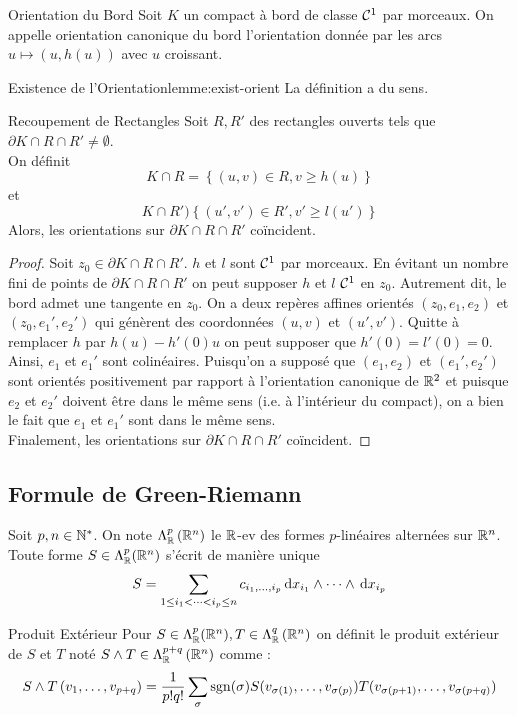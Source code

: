 \documentclass{cours}
\begin{document}
\begin{définition}{Orientation du Bord}{}
	Soit $K$ un compact à bord de classe $\mathcal{C}^{1}$ par morceaux. On appelle orientation canonique du bord l'orientation donnée par les arcs $u \mapsto (u, h(u))$ avec $u$ croissant.
\end{définition}

\begin{lemme}{Existence de l'Orientation}{lemme:exist-orient}
	La définition a du sens.
\end{lemme}
\begin{lemme}{Recoupement de Rectangles}{}
	Soit $R, R'$ des rectangles ouverts tels que $\partial K \cap R \cap R' \neq \emptyset$.\\
	On définit 
	\[
		K \cap R = \left\{(u, v) \in R, v\geq h(u)\right\}
	\]
	et 
	\[
		K \cap R' ) \left\{(u', v')\in R', v' \geq l(u')\right\}
	\]
	Alors, les orientations sur $\partial K \cap R \cap R'$ coïncident.
\end{lemme}
\begin{proof}
	Soit $z_{0}  \in \partial K \cap R \cap R'$. $h$ et $l$ sont $\mathcal{C}^{1}$ par morceaux. 
	En évitant un nombre fini de points de $\partial K \cap R\cap R'$ on peut supposer $h$ et $l$ $\mathcal{C}^{1}$ en $z_{0}$. 
	Autrement dit, le bord admet une tangente en $z_{0}$. On a deux repères affines orientés $(z_{0}, e_{1}, e_{2})$ et $(z_{0}, e_{1}', e_{2}')$ qui génèrent des coordonnées $(u, v)$ et $(u', v')$.
	Quitte à remplacer $h$ par $h(u) - h'(0)u$ on peut supposer que $h'(0) = l'(0) = 0$. \\
	Ainsi, $e_{1}$ et $e_{1}'$ sont colinéaires. Puisqu'on a supposé que $(e_{1}, e_{2})$ et $(e_{1}', e_{2}')$ sont orientés positivement par rapport à l'orientation canonique de $\mathbb{R}^{2}$ et puisque $e_{2}$ et $e_{2}'$ doivent être dans le même sens (i.e. à l'intérieur du compact), on a bien le fait que $e_{1}$ et $e_{1}'$ sont dans le même sens.\\
	Finalement, les orientations sur $\partial K \cap R \cap R'$ coïncident. 
\end{proof}

\subsection{Formule de Green-Riemann}
Soit $p, n \in \mathbb{N}^{*}$. On note $\Lambda_{\mathbb{R}}^{p}\left(\mathbb{R}^{n}\right)$ le $\mathbb{R}$-ev des formes $p$-linéaires alternées sur $\mathbb{R}^{n}$. Toute forme $S \in \Lambda_{\mathbb{R}}^{p}(\mathbb{R}^{n})$ s'écrit de manière unique 
\[
    S = \sum_{1 \leq i_{1} < \cdots <i_{p} \leq n}c_{i_{1},\ldots, i_{p}}{\rm \, d} x_{i_{1}} \land \cdots \land {\rm \, d} x_{i_{p}}
\]
\begin{définition}{Produit Extérieur}{}
    Pour $S \in \Lambda_{\mathbb{R}}^{p}(\mathbb{R}^{n}), T\in \Lambda_{\mathbb{R}}^{q}\left(\mathbb{R}^{n}\right)$ on définit le produit extérieur de $S$ et $T$ noté $S \land T \in \Lambda_{\mathbb{R}}^{p + q}\left(\mathbb{R}^{n}\right)$ comme : 
    \[
        S\land T\left(v_{1}, \ldots, v_{p + q}\right) = \frac{1}{p!q!}\sum_{\sigma}\operatorname{sgn}(\sigma)S(v_{\sigma(1)},\ldots, v_{\sigma(p)})T(v_{\sigma(p + 1)}, \ldots, v_{\sigma(p + q)})
    \]
\end{définition}
\end{document}
